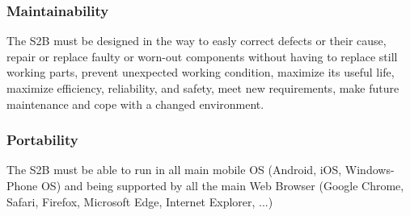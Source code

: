 	\subsubsection{Maintainability}
	The S2B must be designed in the way to easly correct defects or their cause,
	repair or replace faulty or worn-out components without having to replace still working parts,
	prevent unexpected working condition,
	maximize its useful life,
	maximize efficiency, reliability, and safety,
	meet new requirements,
	make future maintenance and
	cope with a changed environment.
	
	\subsubsection{Portability}
	The S2B must be able to run in all main mobile OS (Android, iOS, Windows-Phone OS) and being supported by all the main Web Browser (Google Chrome, Safari, Firefox, Microsoft Edge, Internet Explorer, ...)\newline
	
